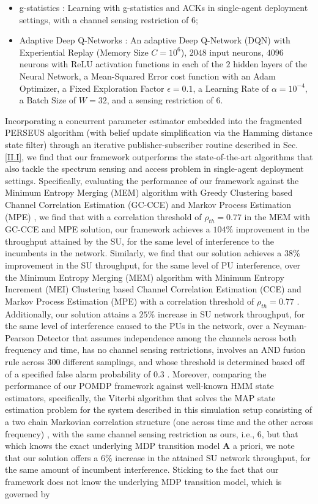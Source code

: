 \documentclass[12pt, draftcls, onecolumn]{IEEEtran}
\begin{document}
\begin{itemize}
    \item g-statistics \cite{WCL:MIT}: Learning with g-statistics and ACKs in single-agent deployment settings, with a channel sensing restriction of $6$;
    \item Adaptive Deep Q-Networks \cite{WCL:DQN}: An adaptive Deep Q-Network (DQN) with Experiential Replay (Memory Size $C{=}10^{6}$), $2048$ input neurons, $4096$ neurons with ReLU activation functions in each of the $2$ hidden layers of the Neural Network, a Mean-Squared Error cost function with an Adam Optimizer, a Fixed Exploration Factor $\epsilon{=}0.1$, a Learning Rate of $\alpha{=}10^{-4}$, a Batch Size of $W{=}32$, and a sensing restriction of $6$.
\end{itemize}

Incorporating a concurrent parameter estimator embedded into the fragmented PERSEUS algorithm (with belief update simplification via the Hamming distance state filter) through an iterative publisher-subscriber routine described in Sec. \ref{II.I}, we find that our framework outperforms the state-of-the-art algorithms that also tackle the spectrum sensing and access problem in single-agent deployment settings. Specifically, evaluating the performance of our framework against the Minimum Entropy Merging (MEM) algorithm with Greedy Clustering based Channel Correlation Estimation (GC-CCE) and Markov Process Estimation (MPE) \cite{WCL:7}, we find that with a correlation threshold of $\rho_{th}{=}0.77$ in the MEM with GC-CCE and MPE solution, our framework achieves a $104$\% improvement in the throughput attained by the SU, for the same level of interference to the incumbents in the network. Similarly, we find that our solution achieves a $38$\% improvement in the SU throughput, for the same level of PU interference, over the Minimum Entropy Merging (MEM) algorithm with Minimum Entropy Increment (MEI) Clustering based Channel Correlation Estimation (CCE) and Markov Process Estimation (MPE) with a correlation threshold of $\rho_{th}{=}0.77$ \cite{WCL:7}. Additionally, our solution attains a $25$\% increase in SU network throughput, for the same level of interference caused to the PUs in the network, over a Neyman-Pearson Detector that assumes independence among the channels across both frequency and time, has no channel sensing restrictions, involves an AND fusion rule across 300 different samplings, and whose threshold is determined based off of a specified false alarm probability of $0.3$ \cite{WCL:11}. Moreover, comparing the performance of our POMDP framework against well-known HMM state estimators, specifically, the Viterbi algorithm that solves the MAP state estimation problem for the system described in this simulation setup consisting of a two chain Markovian correlation structure (one across time and the other across frequency) \cite{WCL:6}, with the same channel sensing restriction as ours, i.e., $6$, but that which knows the exact underlying MDP transition model $\mathbf{A}$ a priori, we note that our solution offers a $6$\% increase in the attained SU network throughput, for the same amount of incumbent interference. Sticking to the fact that our framework does not know the underlying MDP transition model, which is governed by 
\end{document}
